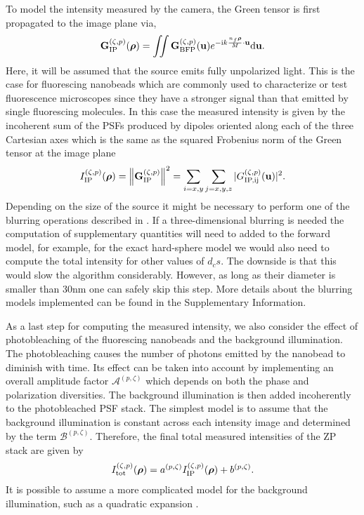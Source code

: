 \documentclass[reprint,aps,pra,superscriptaddress,
amsmath,amssymb]{revtex4-1}
\begin{document}
To model the intensity measured by the camera, the Green tensor is first 
propagated to the image plane via,
\begin{align}
\textbf G^{(\zeta ,p)}_\text{IP} (\boldsymbol \rho ) 
= \iint \textbf G^{(\zeta ,p)}_\text{BFP} (\textbf u)  
e^{ - \text{i} k  \frac{n_f \boldsymbol \rho}{M}  \cdot \textbf u } \mathrm{d} \textbf u .
\end{align}
Here, it will be assumed that the source emits fully unpolarized light. This 
is the case for fluorescing nanobeads which are commonly used to characterize or test 
fluorescence microscopes since they have a stronger signal than that emitted 
by single fluorescing molecules. In this case the measured intensity is 
given by the incoherent sum of the PSFs produced by dipoles oriented along 
each of the three Cartesian axes which is the same as the squared Frobenius 
norm of the Green tensor at the image plane 
\begin{align}
I^{(\zeta ,p)}_\text{IP} (\boldsymbol \rho ) = \left\lVert\textbf G^{(\zeta ,p)}_\text{IP} \right\rVert^2 
= \sum_{i=x,y} \sum_{j=x,y,z} |G^{(\zeta ,p)}_\text{IP,ij}( \textbf u)|^2.
\end{align}
Depending on the size of the source it might be necessary to perform 
one of the blurring operations described in \cite{}. If a three-dimensional 
blurring is needed the computation of supplementary quantities will need to 
added to the forward model, for example, for the exact hard-sphere model 
we would also need to compute the total intensity for other values of $d_cs$.
The downside is that this would slow the algorithm considerably. 
However, as long as their 
diameter is smaller than 30nm one can safely skip this step.
More details about the blurring models implemented can be found in the 
Supplementary Information.

As a last step for computing the measured intensity, we also consider 
the effect of photobleaching of the fluorescing nanobeads and the background 
illumination. The photobleaching causes the number of photons emitted by the 
nanobead to diminish with time. Its effect can be taken into account by 
implementing an overall amplitude factor $\mathcal{A}^{(p,\zeta)}$
which depends on both the phase and polarization diversities. The background 
illumination is then added incoherently to the photobleached PSF stack. 
The simplest model is to assume that the background illumination is constant 
across each intensity image and determined by the term 
$\mathcal{B}^{(p,\zeta)}$. Therefore, the final total measured intensities 
of the ZP stack are given by 
\begin{align}
I^{(\zeta ,p)}_\text{tot} (\boldsymbol \rho )  
  =  a^{(p,\zeta)} I^{(\zeta ,p)}_\text{IP} (\boldsymbol \rho ) + b^{(p,\zeta)}.
\end{align}
It is possible to assume a more complicated model for the background 
illumination, such as a quadratic expansion \cite{aristov2018zola}. 
\end{document}
